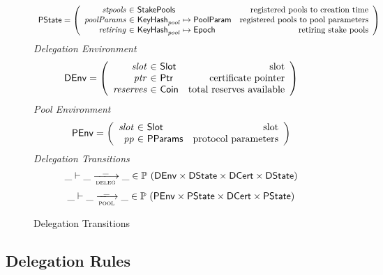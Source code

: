 \begin{figure}
\begin{equation*}
\begin{array}{l}
    \\
    \PState =
    \left(\begin{array}{r@{~\in~}lr}
      \var{stpools} & \StakePools & \text{registered pools to creation time}\\
      \var{poolParams} & \KeyHash_{pool} \mapsto \PoolParam
        & \text{registered pools to pool parameters}\\
      \var{retiring} & \KeyHash_{pool} \mapsto \Epoch & \text{retiring stake pools}\\
    \end{array}\right)
    \end{array}
  \end{equation*}
  \emph{Delegation Environment}
  \begin{equation*}
    \DEnv =
    \left(
      \begin{array}{r@{~\in~}lr}
        \var{slot} & \Slot & \text{slot}\\
        \var{ptr} & \Ptr & \text{certificate pointer}\\
        \var{reserves} & \Coin & \text{total reserves available}
      \end{array}
    \right)
  \end{equation*}
  \emph{Pool Environment}
  \begin{equation*}
    \PEnv =
    \left(
      \begin{array}{r@{~\in~}lr}
        \var{slot} & \Slot & \text{slot}\\
        \var{pp} & \PParams & \text{protocol parameters}\\
      \end{array}
    \right)
  \end{equation*}
  \emph{Delegation Transitions}
  \begin{equation*}
    \_ \vdash \_ \trans{deleg}{\_} \_ \in
      \powerset (\DEnv \times \DState \times \DCert \times \DState)
  \end{equation*}
  \begin{equation*}
    \_ \vdash \_ \trans{pool}{\_} \_ \in
    \powerset (\PEnv \times \PState \times \DCert \times \PState)
  \end{equation*}
  \caption{Delegation Transitions}
  \label{fig:delegation-transitions}
\end{figure}

\clearpage

\subsection{Delegation Rules}
\label{sec:deleg-rules}


